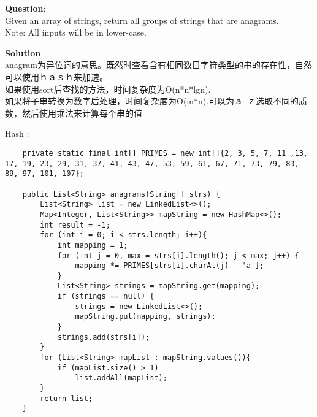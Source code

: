     
\begin{description}
    \item{\textbf{Question}}:\\%
		Given an array of strings, return all groups of strings that are anagrams.\\
		Note: All inputs will be in lower-case.\\

    \item{\textbf{Solution}}\\
		anagram为异位词的意思。既然时查看含有相同数目字符类型的串的存在性，自然可以使用ｈａｓｈ来加速。\\
		如果使用sort后查找的方法，时间复杂度为O(n*n*lgn).\\
		如果将子串转换为数字后处理，时间复杂度为O(m*n).可以为ａ~ｚ选取不同的质数，然后使用乘法来计算每个串的值\\

	\item{Hash} : \\
		\begin{lstlisting}
    private static final int[] PRIMES = new int[]{2, 3, 5, 7, 11 ,13, 17, 19, 23, 29, 31, 37, 41, 43, 47, 53, 59, 61, 67, 71, 73, 79, 83, 89, 97, 101, 107};

    public List<String> anagrams(String[] strs) {
        List<String> list = new LinkedList<>();
        Map<Integer, List<String>> mapString = new HashMap<>();
        int result = -1;
        for (int i = 0; i < strs.length; i++){
            int mapping = 1;
            for (int j = 0, max = strs[i].length(); j < max; j++) {
                mapping *= PRIMES[strs[i].charAt(j) - 'a'];
            }
            List<String> strings = mapString.get(mapping);
            if (strings == null) {
                strings = new LinkedList<>();
                mapString.put(mapping, strings);
            }
            strings.add(strs[i]);
        }
        for (List<String> mapList : mapString.values()){
            if (mapList.size() > 1)
                list.addAll(mapList);
        }
        return list;
    }
		\end{lstlisting}

\end{description}

